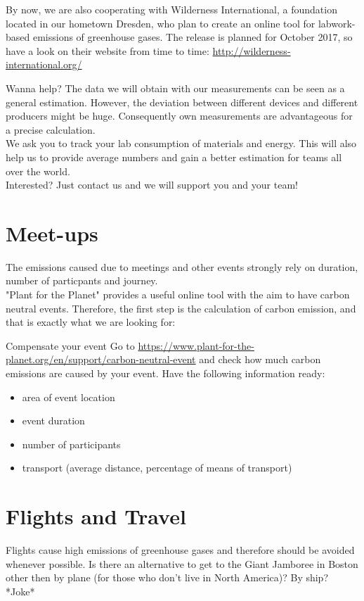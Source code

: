 By now, we are also cooperating with Wilderness International, a foundation located in our hometown Dresden, who plan to create an online tool for labwork-based emissions of greenhouse gases. The release is planned for October 2017, so  have a look on their website from time to time: 
\url{http://wilderness-international.org/} %

\begin{suggest}{Wanna help?}
	The data we will obtain with our measurements can be seen as a general estimation.
	However, the deviation between different devices and different producers might be huge. Consequently own measurements are advantageous for a precise calculation.\\
	We ask you to track your lab consumption of materials and energy. This will also help us to provide average numbers and gain a better estimation for teams all over the world. \\
	Interested? Just contact us and we will support you and your team!
	
\end{suggest}

\section{Meet-ups}

The emissions caused due to meetings and other events strongly rely on duration, number of particpants and journey. \\
"Plant for the Planet" provides a useful online tool with the aim to have carbon neutral events. Therefore, the first step is the calculation of carbon emission, and that is exactly what we are looking for:

\begin{suggest} {Compensate your event}
	Go to \url{https://www.plant-for-the-planet.org/en/support/carbon-neutral-event} %
	and check how much carbon emissions are caused by your event. Have the following information ready:
	\begin{itemize}
		\item area of event location
		\item event duration
		\item number of participants
		\item transport (average distance, percentage of means of transport)
	\end{itemize}
\end{suggest}


\section{Flights and Travel}
Flights cause high emissions of greenhouse gases and therefore should be avoided whenever possible. Is there an alternative to get to the Giant Jamboree in Boston other then by plane (for those who don't live in North America)? By ship? *Joke* 


